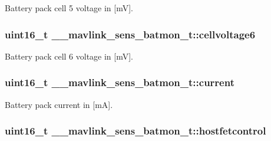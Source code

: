 Battery pack cell 5 voltage in \mbox{[}m\+V\mbox{]}. 

\hypertarget{struct____mavlink__sens__batmon__t_a8f64c9f8a004fea5d08199099da172e6}{
\subsubsection[{cellvoltage6}]{\setlength{\rightskip}{0pt plus 5cm}uint16\+\_\+t \+\_\+\+\_\+mavlink\+\_\+sens\+\_\+batmon\+\_\+t\+::cellvoltage6}}\label{struct____mavlink__sens__batmon__t_a8f64c9f8a004fea5d08199099da172e6}


Battery pack cell 6 voltage in \mbox{[}m\+V\mbox{]}. 

\hypertarget{struct____mavlink__sens__batmon__t_a59e52dfa86a09741bc194f7fa8595d51}{
\subsubsection[{current}]{\setlength{\rightskip}{0pt plus 5cm}uint16\+\_\+t \+\_\+\+\_\+mavlink\+\_\+sens\+\_\+batmon\+\_\+t\+::current}}\label{struct____mavlink__sens__batmon__t_a59e52dfa86a09741bc194f7fa8595d51}


Battery pack current in \mbox{[}m\+A\mbox{]}. 

\hypertarget{struct____mavlink__sens__batmon__t_a8e1a887877d62eaec12fe80c0c84a677}{
\subsubsection[{hostfetcontrol}]{\setlength{\rightskip}{0pt plus 5cm}uint16\+\_\+t \+\_\+\+\_\+mavlink\+\_\+sens\+\_\+batmon\+\_\+t\+::hostfetcontrol}}\label{struct____mavlink__sens__batmon__t_a8e1a887877d62eaec12fe80c0c84a677}


